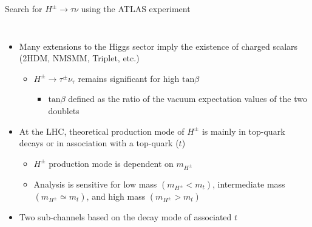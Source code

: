 \documentclass[aspectratio=169,xcolor=table]{beamer}
\newcommand{\Hp}{\ensuremath{H^{\pm}}\xspace}
\newcommand{\HpLong}{\ensuremath{\Hp \rightarrow \tau \nu}\xspace}
\begin{document}
    \begin{frame}[t]{Search for \HpLong using the ATLAS experiment}
      \begin{columns}
      \begin{itemize}
        \item Many extensions to the Higgs sector imply the existence of charged scalars (2HDM, NMSMM, Triplet, etc.)
        \begin{itemize}
          \item $H^{\pm} \to \tau^{\pm}\nu_{\tau}$ remains significant for high $\mathrm{tan} \beta$
          \begin{itemize}
            \item $\mathrm{tan} \beta$ defined as the ratio of the  vacuum expectation values of the two doublets
          \end{itemize}
        \end{itemize}
        \item At the LHC, theoretical production mode of $H^{\pm}$ is mainly in top-quark decays or in association with a top-quark ($t$)
        \begin{itemize}
          \item $H^{\pm}$ production mode is dependent on $m_{H^{\pm}}$
          \item Analysis is sensitive for low mass $(m_{H^{\pm}} < m_{t})$, intermediate mass $(m_{H^{\pm}} \simeq m_{t})$, and high mass $(m_{H^{\pm}} > m_{t})$
        \end{itemize}
        \item Two sub-channels based on the decay mode of associated $t$ 
      \end{itemize}
      \vspace{-.3cm}
      \centering
      \begin{table}
        \end{table}


\end{columns}
\end{frame}
\end{document}
